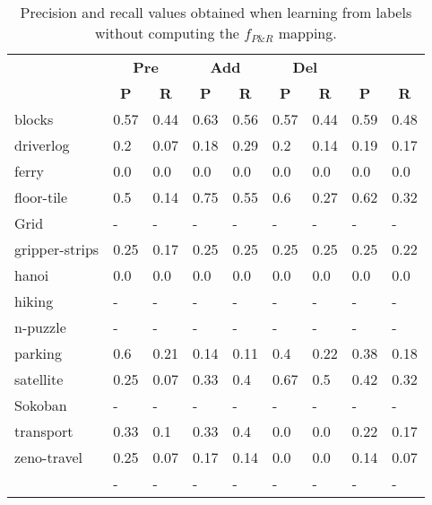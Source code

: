 \documentclass{article}
\begin{document}
\begin{table}
	\begin{center}
		\begin{scriptsize}                
			\begin{tabular}{l|l|l|l|l|l|l||l|l|}
				& \multicolumn{2}{|c|}{\bf Pre} & \multicolumn{2}{|c|}{\bf Add} & \multicolumn{2}{|c||}{\bf Del} & \multicolumn{2}{|c}{\bf}\\ \cline{2-9}			
				& \multicolumn{1}{|c|}{\bf P} & \multicolumn{1}{|c|}{\bf R} & \multicolumn{1}{|c|}{\bf P} & \multicolumn{1}{|c|}{\bf R} & \multicolumn{1}{|c|}{\bf P} & \multicolumn{1}{|c||}{\bf R} &  \multicolumn{1}{|c|}{\bf P} & \multicolumn{1}{|c|}{\bf R} \\
				\hline
				blocks & 0.57 & 0.44 & 0.63 & 0.56 & 0.57 & 0.44 & 0.59 & 0.48 \\
				driverlog & 0.2 & 0.07 & 0.18 & 0.29 & 0.2 & 0.14 & 0.19 & 0.17 \\
				ferry & 0.0 & 0.0 & 0.0 & 0.0 & 0.0 & 0.0 & 0.0 & 0.0 \\
				floor-tile & 0.5 & 0.14 & 0.75 & 0.55 & 0.6 & 0.27 & 0.62 & 0.32 \\
				Grid & - & - & - & - & - & - & - & - \\ %
				gripper-strips & 0.25 & 0.17 & 0.25 & 0.25 & 0.25 & 0.25 & 0.25 & 0.22 \\
				hanoi & 0.0 & 0.0 & 0.0 & 0.0 & 0.0 & 0.0 & 0.0 & 0.0 \\
				hiking & - & - & - & - & - & - & - & - \\ %
				n-puzzle & - & - & - & - & - & - & - & - \\ %
				parking & 0.6 & 0.21 & 0.14 & 0.11 & 0.4 & 0.22 & 0.38 & 0.18 \\
				satellite & 0.25 & 0.07 & 0.33 & 0.4 & 0.67 & 0.5 & 0.42 & 0.32 \\
				Sokoban & - & - & - & - & - & - & - & - \\ %
				transport & 0.33 & 0.1 & 0.33 & 0.4 & 0.0 & 0.0 & 0.22 & 0.17 \\
				zeno-travel & 0.25 & 0.07 & 0.17 & 0.14 & 0.0 & 0.0 & 0.14 & 0.07 \\
				\hline
				\bf  & - & - & - & - & - & - & - & - \\
			\end{tabular}
		\end{scriptsize}
	\end{center}
	\caption{\small Precision and recall values obtained when learning from labels without computing the $f_{P\&R}$ mapping.}
	\label{fig:labelsnomap}                
	

\end{table}
\end{document}
